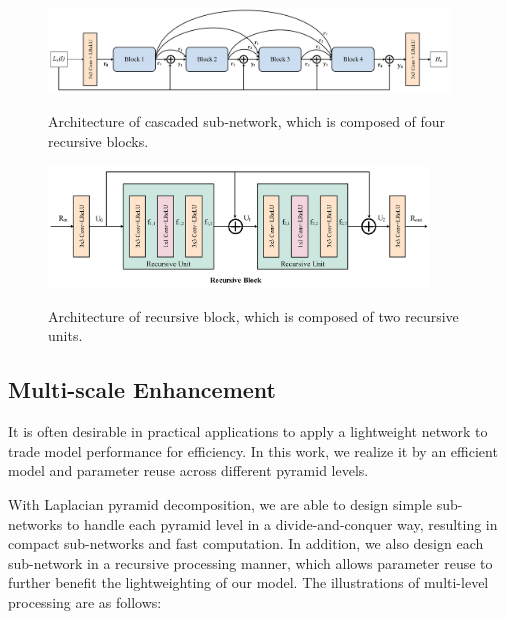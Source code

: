 \documentclass[journal]{IEEEtran}
\begin{document}
\begin{figure}[h] 
\centering 
{   
\includegraphics[width=0.95\textwidth]{Figs/Fig3.png}
}          
\caption{Architecture of cascaded sub-network, which is composed of four recursive blocks.}
\label{Fig3} 
\end{figure} 

\begin{figure}[h] 
\centering 
{   
\includegraphics[width=0.9\textwidth]{Figs/Fig4.png}
}          
\caption{Architecture of recursive block, which is composed of two recursive units.}
\label{Fig4} 
\end{figure} 

\subsection{Multi-scale Enhancement}
It is often desirable in practical applications to apply a lightweight network to trade model performance for efficiency. In this work, we realize it by an efficient model and parameter reuse across different pyramid levels. 

With Laplacian pyramid decomposition, we are able to design simple sub-networks to handle each pyramid level in a divide-and-conquer way, resulting in compact sub-networks and fast computation. In addition, we also design each sub-network in a recursive processing manner, which allows parameter reuse to further benefit the lightweighting of our model. The illustrations of multi-level processing are as follows:
\end{document}

